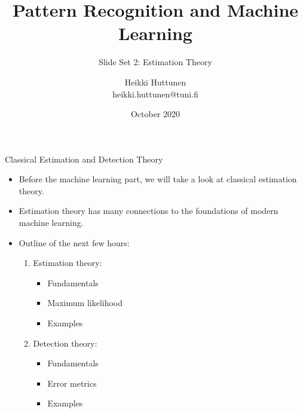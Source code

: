 \documentclass[10pt, aspectratio=169]{beamer} %
\title{Pattern Recognition and Machine Learning}
\subtitle{Slide Set 2: Estimation Theory}
\author{Heikki Huttunen\\
heikki.huttunen@tuni.fi}
\institute{Signal Processing\\Tampere University}
\date{October 2020}
\begin{document}
\maketitle


\lstset{language=Python,style=mystyle} 

\begin{frame}{Classical Estimation and Detection Theory}
\begin{itemize}
\item Before the machine learning part, we will take a look at classical estimation
theory.
\item Estimation theory has many connections to the foundations of modern machine learning.
\item Outline of the next few hours:
\begin{enumerate}
\item Estimation theory: 
\begin{itemize}
\item Fundamentals
\item Maximum likelihood
\item Examples
\end{itemize}
\item Detection theory:
\begin{itemize}
\item Fundamentals
\item Error metrics
\item Examples
\end{itemize}
\end{enumerate}
\end{itemize}
\end{frame}
\end{document}
